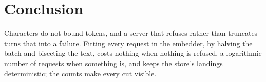 \documentclass[11pt]{article}
\theoremstyle{plain}
\theoremstyle{remark}
\begin{document}
\section{Conclusion}

Characters do not bound tokens, and a server that refuses rather than truncates turns that into a
failure. Fitting every request in the embedder, by halving the batch and bisecting the text, costs
nothing when nothing is refused, a logarithmic number of requests when something is, and keeps the
store's landings deterministic; the counts make every cut visible.



\end{document}
